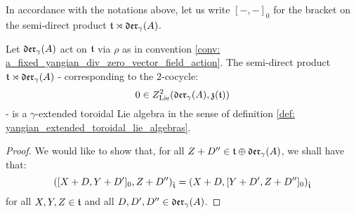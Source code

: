         In accordance with the notations above, let us write $[-, -]_0$ for the bracket on the semi-direct product $\mathfrak{t} \rtimes \mathfrak{der}_{\gamma}(A)$.
        \begin{lemma} \label{lemma: semi_direct_product_of_toroidal_lie_algebras_with_div_zero_vector_fields_are_yangian_extended_toroidal_lie_algebras}
            Let $\mathfrak{der}_{\gamma}(A)$ act on $\mathfrak{t}$ via $\rho$ as in convention \ref{conv: a_fixed_yangian_div_zero_vector_field_action}. The semi-direct product $\mathfrak{t} \rtimes \mathfrak{der}_{\gamma}(A)$ - corresponding to the $2$-cocycle:
                $$0 \in Z^2_{\mathrm{Lie}}(\mathfrak{der}_{\gamma}(A), \mathfrak{z}(\mathfrak{t}))$$
            - is a $\gamma$-extended toroidal Lie algebra in the sense of definition \ref{def: yangian_extended_toroidal_lie_algebras}.
        \end{lemma}
            \begin{proof}
                We would like to show that, for all $Z + D'' \in \mathfrak{t} \oplus \mathfrak{der}_{\gamma}(A)$, we shall have that:
                    $$\left( [X + D, Y + D']_0, Z + D'' \right)_{\hat{\mathfrak{t}}} = \left( X + D, [Y + D', Z + D'']_0 \right)_{\hat{\mathfrak{t}}}$$
                for all $X, Y, Z \in \mathfrak{t}$ and all $D, D', D'' \in \mathfrak{der}_{\gamma}(A)$.
                

\end{proof}
